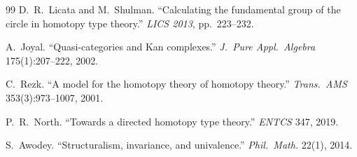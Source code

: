 \documentclass[12pt]{article}
\theoremstyle{definition}
\theoremstyle{remark}
\begin{document}
\begin{thebibliography}{99}
 D.\ R.\ Licata and M.\ Shulman. ``Calculating the fundamental group of the circle in homotopy type theory.'' \emph{LICS 2013}, pp.\ 223--232.

 A.\ Joyal. ``Quasi-categories and Kan complexes.'' \emph{J.\ Pure Appl.\ Algebra} 175(1):207--222, 2002.

 C.\ Rezk. ``A model for the homotopy theory of homotopy theory.'' \emph{Trans.\ AMS} 353(3):973--1007, 2001.

 P.\ R.\ North. ``Towards a directed homotopy type theory.'' \emph{ENTCS} 347, 2019.

 S.\ Awodey. ``Structuralism, invariance, and univalence.'' \emph{Phil.\ Math.} 22(1), 2014.

\end{thebibliography}
\end{document}

